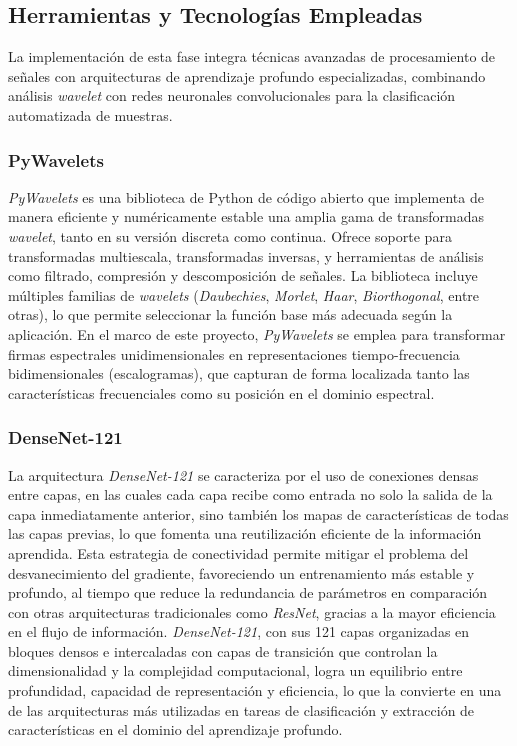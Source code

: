 \subsection{Herramientas y Tecnologías Empleadas}

La implementación de esta fase integra técnicas avanzadas de procesamiento de señales con arquitecturas de aprendizaje profundo especializadas, combinando análisis \emph{wavelet} con redes neuronales convolucionales para la clasificación automatizada de muestras.

\subsubsection{PyWavelets}

\emph{PyWavelets} \cite{lee2019pywavelets} es una biblioteca de Python de código abierto que implementa de manera eficiente y numéricamente estable una amplia gama de transformadas \emph{wavelet}, tanto en su versión discreta como continua. Ofrece soporte para transformadas multiescala, transformadas inversas, y herramientas de análisis como filtrado, compresión y descomposición de señales. La biblioteca incluye múltiples familias de \emph{wavelets} (\emph{Daubechies}, \emph{Morlet}, \emph{Haar}, \emph{Biorthogonal}, entre otras), lo que permite seleccionar la función base más adecuada según la aplicación. En el marco de este proyecto, \emph{PyWavelets} se emplea para transformar firmas espectrales unidimensionales en representaciones tiempo-frecuencia bidimensionales (escalogramas), que capturan de forma localizada tanto las características frecuenciales como su posición en el dominio espectral.

\subsubsection{DenseNet-121}

La arquitectura \emph{DenseNet-121} \cite{huang2018denselyconnectedconvolutionalnetworks} se caracteriza por el uso de conexiones densas entre capas, en las cuales cada capa recibe como entrada no solo la salida de la capa inmediatamente anterior, sino también los mapas de características de todas las capas previas, lo que fomenta una reutilización eficiente de la información aprendida. Esta estrategia de conectividad permite mitigar el problema del desvanecimiento del gradiente, favoreciendo un entrenamiento más estable y profundo, al tiempo que reduce la redundancia de parámetros en comparación con otras arquitecturas tradicionales como \emph{ResNet}, gracias a la mayor eficiencia en el flujo de información. \emph{DenseNet-121}, con sus 121 capas organizadas en bloques densos e intercaladas con capas de transición que controlan la dimensionalidad y la complejidad computacional, logra un equilibrio entre profundidad, capacidad de representación y eficiencia, lo que la convierte en una de las arquitecturas más utilizadas en tareas de clasificación y extracción de características en el dominio del aprendizaje profundo.

